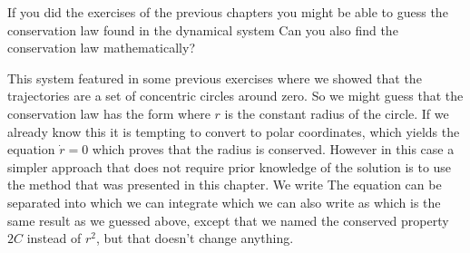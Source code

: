If you did the exercises of the previous chapters you might be able to guess the conservation law found in the dynamical system 
Can you also find the conservation law mathematically?

\solution 
This system featured in some previous exercises where we showed that the trajectories are a set of concentric circles around zero. So we might guess that the conservation law has the form
where $r$ is the constant radius of the circle. If we already know this it is tempting to convert to polar coordinates, which yields the equation $\dot{r}=0$ which proves that the radius is conserved. However in this case a simpler approach that does not require prior knowledge of the solution is to use the method that was presented in this chapter. We write 
The equation 
can be separated into 
which we can integrate 
which we can also write as 
which is the same result as we guessed above, except that we named the conserved property $2C$ instead of $r^2$, but that doesn't change anything.

